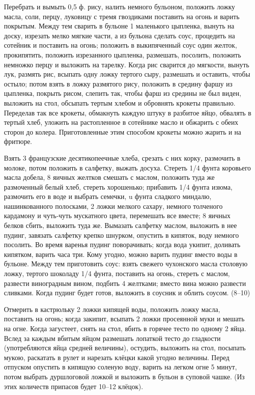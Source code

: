 Перебрать и вымыть 0,5 ф. рису, налить немного бульоном, положить ложку масла, соли, перцу, луковицу с тремя гвоздиками поставить на огонь и варить покрытым. Между тем сварить в бульоне 1 маленького цыпленка, вынуть на доску, изрезать мелко мягкие части, а из бульона сделать соус, процедить на сотейник и поставить на огонь; положить в выкипяченный соус один желток, прокипятить, положить изрезанного цыпленка, размешать, посолить, положить немножко перцу и выложить на тарелку. Когда рис сварится до мягкости, вынуть лук, размять рис, всыпать одну ложку тертого сыру, размешать и оставить, чтобы остыло; потом взять в ложку размятого рису, положить в средину фаршу из цыпленка, покрыть рисом, слепить так, чтобы фарш из средины не был виден, выложить на стол, обсыпать тертым хлебом и обровнять крокеты правильно. Переделав так все крокеты, обмакнуть каждую штуку в разбитое яйцо, обвалять в тертый хлеб, уложить на растопленное в сотейнике масло и обжарить с обеих сторон до колера. Приготовленные этим способом крокеты можно жарить и на фритюре.


Взять 3 французские десятикопеечные хлеба, срезать с них корку, размочить в молоке, потом положить в салфетку, выжать досуха. Стереть 1/4 фунта коровьего масла добела, 8 яичных желтков смешать с маслом, положить туда же размоченный белый хлеб, стереть хорошенько; прибавить 1/4 фунта изюма, размочить его в воде и выбрать семечки, u фунта сладкого миндалю, нашинкованного полосками, 2 ложки мелкого сахару, немного толченого кардамону и чуть-чуть мускатного цвета, перемешать все вместе; 8 яичных белков сбить, выложить туда же. Вымазать салфетку маслом, выложить в нее пудинг, завязать салфетку крепко шнурком, опустить в кипяток, воду немного посолить. Во время варенья пудинг поворачивать; когда вода укипит, доливать кипятком, варить часа три. Кому угодно, можно варить пудинг вместо воды в бульоне. Между тем приготовить соус: взять свежего чухонского масла столовую ложку, тертого шоколаду 1/4 фунта, поставить на огонь, стереть с маслом, развести виноградным вином, подбить 4 желтками; вместо вина можно развести сливками. Когда пудинг будет готов, выложить в соусник и облить соусом. (8--10) 


Отмерить в кастрюльку 2 ложки кипящей воды, положить ложку масла, поставить на огонь; когда закипит, всыпать 2 ложки просеянной муки и мешать на огне. Когда загустеет, снять на стол, вбить в горячее тесто по одному 2 яйца. Вслед за каждым вбитым яйцом размешать лопаткой тесто до гладкости (употребляются яйца средней величины), остудить, выложить на стол, посыпать мукою, раскатать в рулет и нарезать клёцки какой угодно величины. Перед отпуском опустить в кипящую соленую воду, варить на легком огне 5 минут, потом выбрать дуршлоговой ложкой и выложить в бульон в суповой чашке. (Из этих количеств припасов будет 10--12 клёцок). 

